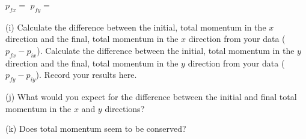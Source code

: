 \( p_{fx} =\)  \hfill{}\( p_{fy}= \) \hfill{} 
\vspace{7mm}

\newpage

(i) Calculate the difference between the initial, total momentum in the $x$ direction and the final, total momentum in the $x$ direction from your data ($p_{fx} - p_{ix}$).
Calculate the difference between the initial, total momentum in the $y$ direction and the final, total momentum in the $y$ direction from your data ($p_{fy} - p_{iy}$).
Record your results here.
\vspace{50mm}

(j) What would you expect for the difference between the initial and final total momentum in the $x$ and $y$ directions?
\vspace{50mm}

(k) Does total momentum seem to be conserved?
